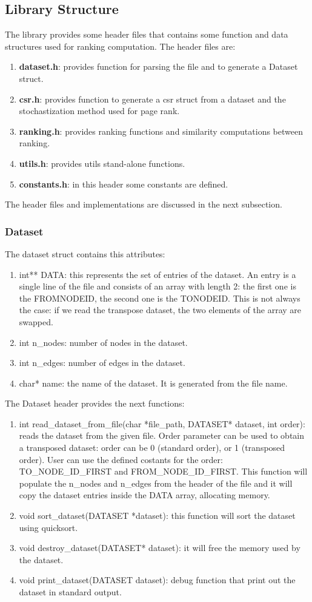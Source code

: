 \documentclass[10pt]{article}
\begin{document}
\subsection{Library Structure}
The library provides some header files that contains some function and data structures used for ranking computation.
The header files are:
\begin{enumerate}
    \item {\bf dataset.h}: provides function for parsing the file and to generate a Dataset struct.
    \item {\bf csr.h}: provides function to generate a csr struct from a dataset and the stochastization method used for page rank.
    \item {\bf ranking.h}: provides ranking functions and similarity computations between ranking.
    \item {\bf utils.h}: provides utils stand-alone functions.
    \item {\bf constants.h}: in this header some constants are defined.
\end{enumerate}
The header files and implementations are discussed in the next subsection.
\subsubsection{Dataset}
The dataset struct contains this attributes:
\begin{enumerate}
    \item int** DATA: this represents the set of entries of the dataset. An entry is a single line of the file and consists of an array with length 2: the first one is the FROMNODEID, the second one is the TONODEID. This is not always the case: if we read the transpose dataset, the two elements of the array are swapped.
    \item int n\_nodes: number of nodes in the dataset.
    \item int n\_edges: number of edges in the dataset.
    \item char* name: the name of the dataset. It is generated from the file name.
\end{enumerate}
The Dataset header provides the next functions:
\begin{enumerate}
    \item int read\_dataset\_from\_file(char *file\_path, DATASET* dataset, int order): reads the dataset from the given file. Order parameter can be used to obtain a transposed dataset: order can be 0 (standard order), or 1 (transposed order). User can use the defined costants for the order: TO\_NODE\_ID\_FIRST and FROM\_NODE\_ID\_FIRST. This function will populate the n\_nodes and n\_edges from the header of the file and it will copy the dataset entries inside the DATA array, allocating memory. 
    \item void sort\_dataset(DATASET *dataset): this function will sort the dataset using quicksort.
    \item void destroy\_dataset(DATASET* dataset): it will free the memory used by the dataset.
    \item void print\_dataset(DATASET dataset): debug function that print out the dataset in standard output.
\end{enumerate}
\end{document}
